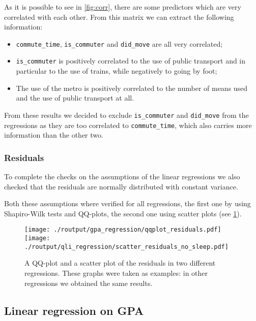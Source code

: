 \documentclass[11pt]{extarticle}
\numberwithin{table}{section}
\numberwithin{figure}{section}
\numberwithin{equation}{section}
\begin{document}
As it is possible to see in \cref{fig:corr}, there are some predictors which
are very correlated with each other.
From this matrix we can extract the following information:
\begin{itemize}
	\item \texttt{commute\_time}, \texttt{is\_commuter} and \texttt{did\_move}
	      are all very correlated;
	\item \texttt{is\_commuter} is positively correlated to the use of public transport
	      and in particular to the use of trains, while negatively to going by foot;
	\item The use of the metro is positively correlated to
	      the number of means used and the use of public transport at all.
\end{itemize}

From these results we decided to exclude \texttt{is\_commuter} and \texttt{did\_move}
from the regressions as they are too correlated to \texttt{commute\_time},
which also carries more information than the other two.

\subsubsection{Residuals}

To complete the checks on the assumptions of the linear regressions
we also checked that the residuals are normally distributed with constant variance.

Both these assumptions where verified for all regressions,
the first one by using Shapiro-Wilk tests and QQ-plots, the second one using scatter plots (see \cref{fig:residuals}).

\begin{figure}[!ht]
	\centering
	{\texttt{[image: ./routput/gpa\_regression/qqplot\_residuals.pdf]}}
	\hspace{1cm}
	{\texttt{[image: ./routput/qli\_regression/scatter\_residuals\_no\_sleep.pdf]}}
	\caption{A QQ-plot and a scatter plot of the residuals in two different regressions.
		These graphs were taken as examples:
		in other regressions we obtained the same results.}
	\label{fig:residuals}
\end{figure}

\subsection{Linear regression on GPA}
\end{document}
